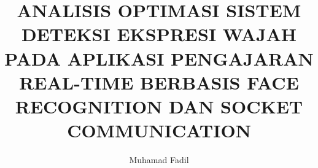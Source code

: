 \documentclass{kti}
\title{ANALISIS OPTIMASI SISTEM DETEKSI EKSPRESI WAJAH PADA APLIKASI PENGAJARAN REAL-TIME BERBASIS FACE RECOGNITION DAN SOCKET COMMUNICATION}
\author{Muhamad Fadil}
\begin{document}
\frontmatter
\cover






\end{document}

